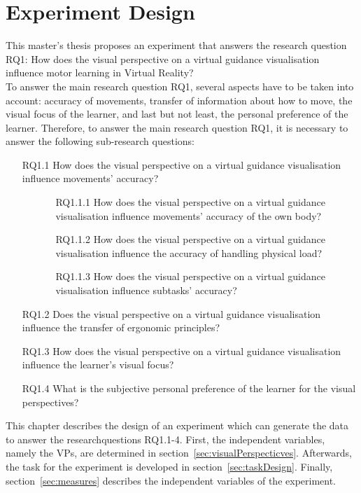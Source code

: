 \chapter{Experiment Design}
\label{chapter:studysetting_conduction}
This master's thesis proposes an experiment that answers the research question RQ1: How does the visual perspective on a virtual guidance visualisation influence motor learning in Virtual Reality?\\

To answer the main research question RQ1, several aspects have to be taken into account: accuracy of movements, transfer of information about how to move, the visual focus of the learner, and last but not least, the personal preference of the learner. Therefore, to answer the main research question RQ1, it is necessary to answer the following sub-research questions:
\begin{enumerate}[align=left, leftmargin=0pt, labelindent=\parindent,
	listparindent=\parindent, labelwidth=0pt, itemindent=!]
	\item[RQ1.1] How does the visual perspective on a virtual guidance visualisation influence movements' accuracy?
	\begin{itemize}
		\item[] \begin{itemize}
			\item[RQ1.1.1] How does the visual perspective on a virtual guidance visualisation influence movements' accuracy of the own body?
			\item[RQ1.1.2] How does the visual perspective on a virtual guidance visualisation influence the accuracy of handling physical load?
			\item[RQ1.1.3] How does the visual perspective on a virtual guidance visualisation influence subtasks' accuracy?
		\end{itemize}
	\end{itemize}
	\item[RQ1.2] Does the visual perspective on a virtual guidance visualisation influence the transfer of ergonomic principles?
	\item[RQ1.3] How does the visual perspective on a virtual guidance visualisation influence the learner's visual focus?
	\item[RQ1.4] What is the subjective personal preference of the learner for the visual perspectives?
\end{enumerate}
This chapter describes the design of an experiment which can generate the data to answer the researchquestions RQ1.1-4. First, the independent variables, namely the VPs, are determined in section~\ref{sec:visualPerspecticves}. Afterwards, the task for the experiment is developed in section~\ref{sec:taskDesign}. Finally, section~\ref{sec:measures} describes the independent variables of the experiment.

